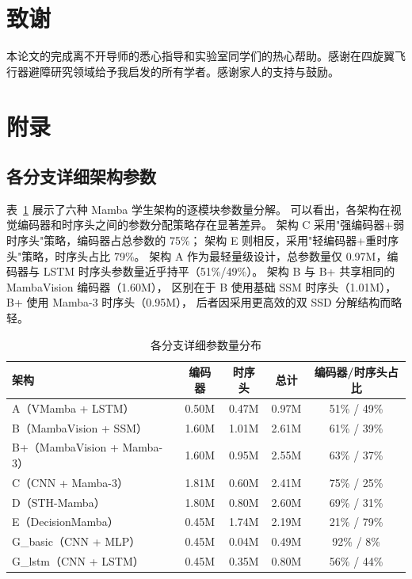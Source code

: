 \documentclass[12pt,a4paper]{article}
\numberwithin{equation}{section}
\numberwithin{figure}{section}
\numberwithin{table}{section}
\begin{document}


\section*{致谢}
本论文的完成离不开导师的悉心指导和实验室同学们的热心帮助。感谢在四旋翼飞行器避障研究领域给予我启发的所有学者。感谢家人的支持与鼓励。
\section{附录}

\subsection{各分支详细架构参数}
\label{app:arch_params}

表~\ref{tab:app_params} 展示了六种 Mamba 学生架构的逐模块参数量分解。
可以看出，各架构在视觉编码器和时序头之间的参数分配策略存在显著差异。
架构 C 采用"强编码器+弱时序头"策略，编码器占总参数的 75\%；
架构 E 则相反，采用"轻编码器+重时序头"策略，时序头占比 79\%。
架构 A 作为最轻量级设计，总参数量仅 0.97M，编码器与 LSTM 时序头参数量近乎持平（51\%/49\%）。
架构 B 与 B+ 共享相同的 MambaVision 编码器（1.60M），
区别在于 B 使用基础 SSM 时序头（1.01M），B+ 使用 Mamba-3 时序头（0.95M），
后者因采用更高效的双 SSD 分解结构而略轻。

\begin{table}[H]
\centering
\caption{各分支详细参数量分布}
\label{tab:app_params}
\begin{tabular}{lcccc}
\toprule
\textbf{架构} & \textbf{编码器} & \textbf{时序头} & \textbf{总计} & \textbf{编码器/时序头占比} \\
\midrule
A（VMamba + LSTM） & 0.50M & 0.47M & 0.97M & 51\% / 49\% \\
B（MambaVision + SSM） & 1.60M & 1.01M & 2.61M & 61\% / 39\% \\
B+（MambaVision + Mamba-3） & 1.60M & 0.95M & 2.55M & 63\% / 37\% \\
C（CNN + Mamba-3） & 1.81M & 0.60M & 2.41M & 75\% / 25\% \\
D（STH-Mamba） & 1.80M & 0.80M & 2.60M & 69\% / 31\% \\
E（DecisionMamba） & 0.45M & 1.74M & 2.19M & 21\% / 79\% \\
G\_basic（CNN + MLP） & 0.45M & 0.04M & 0.49M & 92\% / 8\% \\
G\_lstm（CNN + LSTM） & 0.45M & 0.35M & 0.80M & 56\% / 44\% \\
\bottomrule
\end{tabular}
\end{table}
\end{document}
